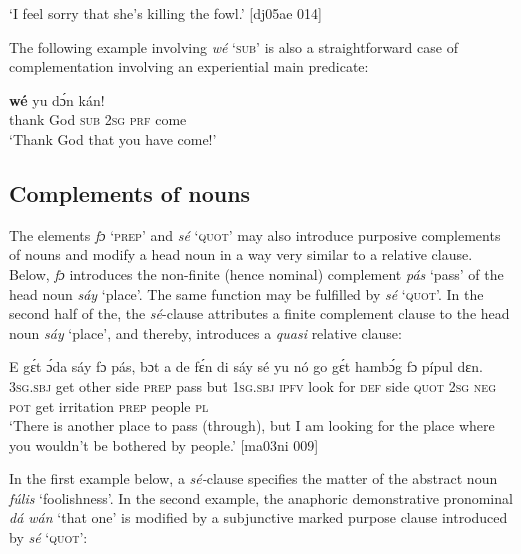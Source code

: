 \glt ‘I feel sorry that she’s killing the fowl.’ [dj05ae 014]
\z

The following example involving \textit{wé} ‘\textsc{sub}’ is also a straightforward case of complementation involving an experiential main predicate: 


\ea%
    \label{ex:key:1416}
    \gll {}    \textbf{wé}  yu  dɔ́n  kán!\\
thank  God  \textsc{sub}  \textsc{2sg}  \textsc{prf}  come\\

\glt ‘Thank God that you have come!’
\z

\subsection{Complements of nouns}\label{sec:10.5.8}

The elements \textit{fɔ} ‘\textsc{prep}’ and \textit{sé} ‘\textsc{quot}’ may also introduce purposive complements of nouns and modify a head noun in a way very similar to a relative clause. Below, \textit{fɔ} introduces the non-finite (hence nominal) complement \textit{pás} ‘pass’ of the head noun \textit{sáy} ‘place’. The same function may be fulfilled by \textit{sé} ‘\textsc{quot}’. In the second half of the, the \textit{sé}{}-clause attributes a finite complement clause to the head noun \textit{sáy} ‘place’, and thereby, introduces a \textit{quasi} relative clause:


\ea%
    \label{ex:key:1417}
    \gll E    gɛ́t  ɔ́da    sáy    fɔ  pás,    bɔt  a    de  fɛ́n
di  sáy    sé    yu    nó  go  gɛ́t  hambɔ́g    fɔ  pípul  dɛn.\\
\textsc{3sg.sbj}  get  other  side    \textsc{prep}  pass    but  \textsc{1sg.sbj}  \textsc{ipfv}  {look for}  
\textsc{def}  side    \textsc{quot}   \textsc{2sg}    \textsc{neg}  \textsc{pot}  get  irritation  \textsc{prep}  people  \textsc{pl}\\

\glt ‘There is another place to pass (through), but I am looking for the place where you
wouldn’t be bothered by people.’ [ma03ni 009]
\z

In the first example below, a \textit{sé-}clause specifies the matter of the abstract noun \textit{fúlis} ‘foolishness’. In the second example, the anaphoric demonstrative pronominal \textit{dá wán} ‘that one’ is modified by a subjunctive marked purpose clause introduced by \textit{sé} ‘\textsc{quot}’:



